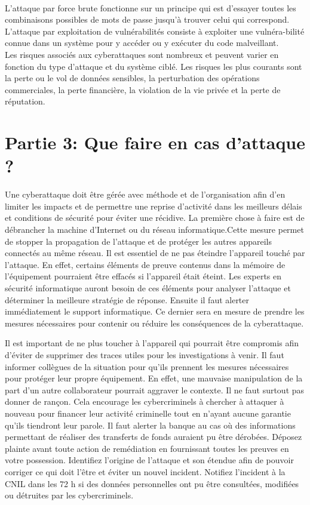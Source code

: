 \documentclass[a4paper,11pt]{article}
\begin{document}
\\L'attaque par force brute fonctionne sur un principe qui est d'essayer toutes les combinaisons possibles de mots de passe jusqu'à trouver celui qui correspond.
\\L'attaque par exploitation de vulnérabilités consiste à exploiter une vulnéra-bilité connue dans un système pour y accéder ou y exécuter du code malveillant.
\\Les risques associés aux cyberattaques sont nombreux et peuvent varier en fonction du type d'attaque et du système ciblé. Les risques les plus courants sont la perte ou le vol de données sensibles, la perturbation des opérations commerciales, la perte f{\null}inancière, la violation de la vie privée et la perte de réputation.


\section{Partie 3: Que faire en cas d’attaque ?}

Une cyberattaque doit être gérée avec méthode et de l’organisation afin d’en limiter les impacts et de permettre une reprise d’activité dans les meilleurs délais et conditions de sécurité pour éviter une récidive.
La première chose à faire est de débrancher la machine d’Internet ou du réseau informatique.Cette mesure permet de stopper la propagation de l’attaque et de protéger les autres appareils connectés au même réseau.
Il est essentiel de ne pas éteindre l’appareil touché par l’attaque. En effet, certains éléments de preuve contenus dans la mémoire de l’équipement pourraient être effacés si l’appareil était éteint. Les experts en sécurité informatique auront besoin de ces éléments pour analyser l’attaque et déterminer la meilleure stratégie de réponse.
Ensuite il faut alerter immédiatement le support informatique. Ce dernier sera en mesure de prendre les mesures nécessaires pour contenir ou réduire les conséquences de la cyberattaque.

Il est important de ne plus toucher à l’appareil qui pourrait être compromis afin d’éviter de supprimer des traces utiles pour les investigations à venir. 
Il faut informer collègues de la situation pour qu’ils prennent les mesures nécessaires pour protéger leur propre équipement. En effet, une mauvaise manipulation de la part d’un autre collaborateur pourrait aggraver le contexte.
Il ne faut surtout pas donner de rançon. Cela encourage les cybercriminels à chercher à attaquer à nouveau pour financer leur activité criminelle tout en n’ayant aucune garantie qu’ils tiendront leur parole.
Il faut alerter la banque au cas où des informations permettant de réaliser des transferts de fonds auraient pu être dérobées.
Déposez plainte avant toute action de remédiation en fournissant toutes les preuves en votre possession.
Identifiez l’origine de l’attaque et son étendue afin de pouvoir corriger ce qui doit l’être et éviter un nouvel incident.
Notifiez l’incident à la CNIL dans les 72 h si des données personnelles ont pu être consultées, modifiées ou détruites par les cybercriminels.
\end{document}
